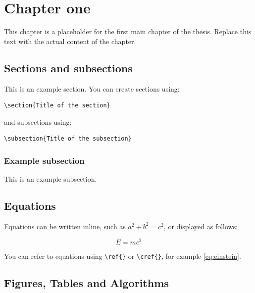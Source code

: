 \chapter{Chapter one}
\label{ch:chapter_one}

This chapter is a placeholder for the first main chapter of the thesis. Replace this text with the actual content of the chapter.

\section{Sections and subsections}
\label{sec:sections_subsections}

This is an example section. You can create sections using:

\begin{verbatim}
\section{Title of the section}
\end{verbatim}

and subsections using:

\begin{verbatim}
\subsection{Title of the subsection}
\end{verbatim}

\subsection{Example subsection}
\label{subsec:example_subsection}

This is an example subsection.

\section{Equations}
\label{sec:equations}

Equations can be written inline, such as $a^2 + b^2 = c^2$, or displayed as follows:

\begin{equation}
    E = mc^2
    \label{eq:einstein}
\end{equation}

You can refer to equations using \verb|\ref{}| or \verb|\cref{}|, for example \cref{eq:einstein}.

\section{Figures, Tables and Algorithms}
\label{sec:figures_tables_algorithms}

